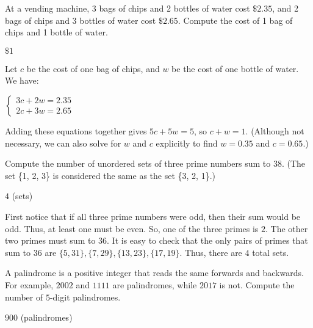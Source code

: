 \documentclass[11pt]{article}
\begin{document}
\begin{problem}
At a vending machine, 3 bags of chips and 2 bottles of water cost $\$2.35$, and 2 bags of chips and 3 bottles of water cost $\$2.65$. Compute the cost of 1 bag of chips and 1 bottle of water.
\end{problem}

\begin{answer}
$\boxed{\$1}$
\end{answer}

\begin{solution}
Let $c$ be the cost of one bag of chips, and $w$ be the cost of one bottle of water. We have: \begin{center}$\begin{cases} 3c + 2w = 2.35 \\ 2c + 3w = 2.65 \end{cases}$\end{center} Adding these equations together gives $5c + 5w = 5$, so $c + w = \boxed{1}$. (Although not necessary, we can also solve for $w$ and $c$ explicitly to find $w = 0.35$ and $c = 0.65$.)
\end{solution}

\begin{problem}
Compute the number of unordered sets of three prime numbers sum to $38$. (The set \{1, 2, 3\} is considered the same as the set \{3, 2, 1\}.)
\end{problem}

\begin{answer}
$\boxed{4}$ (sets)
\end{answer}

\begin{solution}
First notice that if all three prime numbers were odd, then their sum would be odd. Thus, at least one must be even. So, one of the three primes is $2$. The other two primes must sum to $36$. It is easy to check that the only pairs of primes that sum to $36$ are $\{5, 31\}, \{7, 29\}, \{13, 23\}, \{17, 19\}$. Thus, there are $\boxed{4}$ total sets.
\end{solution}

\begin{problem}
A palindrome is a positive integer that reads the same forwards and backwards. For example, $2002$ and $1111$ are palindromes, while $2017$ is not. Compute the number of $5$-digit palindromes.
\end{problem}

\begin{answer}
$\boxed{900}$ (palindromes)
\end{answer}
\end{document}
